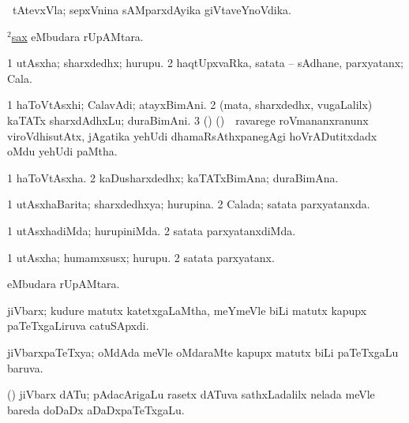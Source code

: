 \bentry
{} 
\gl{\nA} 
\bmng
\Sp\ tAtevxVla; sepxVnina sAMparxdAyika giVtaveYnoVdika.
\emng
\eentry

\bentry
{} 
\gl{\nA}
\bmng
\hyperref{kandict_s.pdf}{S}{sax(2)}{$^2$sax} eMbudara rUpAMtara.
\emng
\eentry

\bentry
{} 
\gl{\nA}
\bmng
\bnum
\num{1} utAsxha; sharxdedhx; hurupu. 
\num{2} haqtUpxvaRka, satata -- sAdhane, parxyatanx; Cala.
\enum
\emng
\eentry

\bentry
{} 
\gl{\nA} 
\bmng
\bnum
\num{1} haToVtAsxhi; CalavAdi; atayxBimAni.  
\num{2} (mata, sharxdedhx, \mo vugaLalilx) kaTATx sharxdAdhxLu; duraBimAni. 
\num{3} () (\ca) \kirxsha\ \,ravarege roVmananxranunx viroVdhisutAtx, jAgatika yehUdi dhamaRsAthxpanegAgi hoVrADutitxdadx oMdu yehUdi paMtha.
\enum
\emng
\eentry

\bentry
{} 
\gl{\nA} 
\bmng
\bnum
\num{1} haToVtAsxha. 
\num{2} kaDusharxdedhx; kaTATxBimAna; duraBimAna.
\enum
\emng
\eentry

\bentry
{} 
\gl{\gu} 
\bmng
\bnum
\num{1} utAsxhaBarita; sharxdedhxya; hurupina. 
\num{2} Calada; satata parxyatanxda.
\enum
\emng
\eentry

\bentry
{} 
\gl{\kirxvi} 
\bmng
\bnum
\num{1} utAsxhadiMda; hurupiniMda. 
\num{2} satata parxyatanxdiMda.
\enum
\emng
\eentry

\bentry
{} 
\gl{\nA} 
\bmng
\bnum
\num{1} utAsxha; humamxsusx; hurupu. 
\num{2} satata parxyatanx.
\enum
\emng
\eentry

\bentry
{} 
\gl{\nA} 
\bmng
{} eMbudara rUpAMtara.
\emng
\eentry

\bentry
{} 
\gl{\nA}
\bmng
jiVbarx; kudure matutx katetxgaLaMtha, meYmeVle biLi matutx kapupx  paTeTxgaLiruva catuSApxdi.  
\emng
\eentry

\bentry
{} 
\gl{\gu} 
\bmng
jiVbarxpaTeTxya; oMdAda meVle oMdaraMte kapupx matutx biLi paTeTxgaLu baruva.
\emng
\eentry

\bentry
{}  
\gl{\nA} 
\bmng
(\birx) jiVbarx dATu; pAdacArigaLu rasetx dATuva sathxLadalilx nelada  meVle bareda doDaDx aDaDxpaTeTxgaLu.
\emng
\eentry


